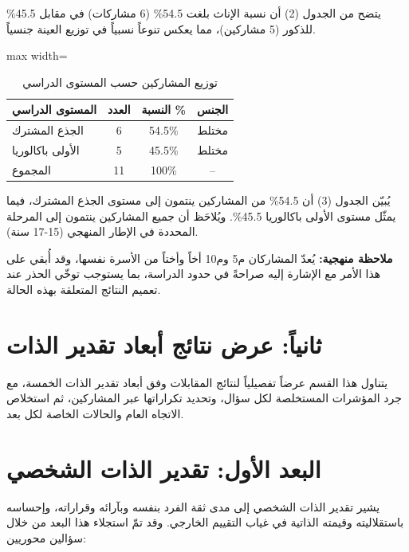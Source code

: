 \documentclass[12pt,oneside]{report}
\begin{document}
يتضح من الجدول (2) أن نسبة الإناث بلغت \textenglish{54.5\%} (6 مشاركات) في مقابل \textenglish{45.5\%} للذكور (5 مشاركين)، مما يعكس تنوعاً نسبياً في توزيع العينة جنسياً.

\begin{table}[H]
\centering
\caption{توزيع المشاركين حسب المستوى الدراسي}
\small
\renewcommand{\arraystretch}{1.3}
\setlength{\tabcolsep}{4pt}
\begin{adjustbox}{max width=\textwidth}
\begin{tabular}{l c c c}
\toprule
\textbf{المستوى الدراسي} & \textbf{العدد} & \textbf{النسبة \%} & \textbf{الجنس} \\
\midrule
الجذع المشترك & 6 & \textenglish{54.5\%} & مختلط \\
الأولى باكالوريا & 5 & \textenglish{45.5\%} & مختلط \\
المجموع & 11 & 100\% & -- \\
\bottomrule
\end{tabular}
\end{adjustbox}
\end{table}
يُبيّن الجدول (3) أن \textenglish{54.5\%} من المشاركين ينتمون إلى مستوى الجذع المشترك، فيما يمثّل مستوى الأولى باكالوريا \textenglish{45.5\%}. ويُلاحَظ أن جميع المشاركين ينتمون إلى المرحلة المحددة في الإطار المنهجي (15-17 سنة).

\noindent\textbf{ملاحظة منهجية:} يُعدّ المشاركان م5 وم10 أخاً وأختاً من الأسرة نفسها، وقد أُبقي على هذا الأمر مع الإشارة إليه صراحةً في حدود الدراسة، بما يستوجب توخّي الحذر عند تعميم النتائج المتعلقة بهذه الحالة.\par
\section{ثانياً: عرض نتائج أبعاد تقدير الذات}
يتناول هذا القسم عرضاً تفصيلياً لنتائج المقابلات وفق أبعاد تقدير الذات الخمسة، مع جرد المؤشرات المستخلصة لكل سؤال، وتحديد تكراراتها عبر المشاركين، ثم استخلاص الاتجاه العام والحالات الخاصة لكل بعد.

\section{البعد الأول: تقدير الذات الشخصي}
يشير تقدير الذات الشخصي إلى مدى ثقة الفرد بنفسه وبآرائه وقراراته، وإحساسه باستقلاليته وقيمته الذاتية في غياب التقييم الخارجي. وقد تمّ استجلاء هذا البعد من خلال سؤالين محوريين:
\end{document}
